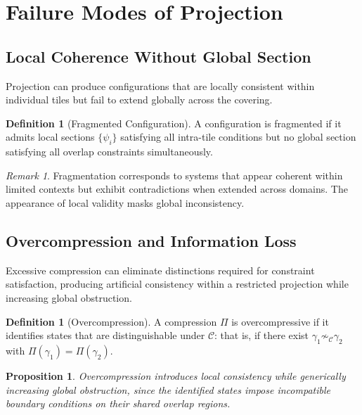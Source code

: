 \documentclass[11pt]{article}
\theoremstyle{plain}
\newtheorem{proposition}[theorem]{Proposition}
\theoremstyle{definition}
\newtheorem{definition}[theorem]{Definition}
\theoremstyle{remark}
\newtheorem{remark}[theorem]{Remark}
\begin{document}
\section{Failure Modes of Projection}

\subsection{Local Coherence Without Global Section}

Projection can produce configurations that are locally consistent within
individual tiles but fail to extend globally across the covering.

\begin{definition}[Fragmented Configuration]
A configuration is fragmented if it admits local sections $\{\psi_i\}$
satisfying all intra-tile conditions but no global section satisfying
all overlap constraints simultaneously.
\end{definition}

\begin{remark}
Fragmentation corresponds to systems that appear coherent within limited
contexts but exhibit contradictions when extended across domains. The
appearance of local validity masks global inconsistency.
\end{remark}

\subsection{Overcompression and Information Loss}

Excessive compression can eliminate distinctions required for constraint
satisfaction, producing artificial consistency within a restricted
projection while increasing global obstruction.

\begin{definition}[Overcompression]
A compression $\Pi$ is overcompressive if it identifies states that are
distinguishable under $\mathcal{C}$: that is, if there exist
$\gamma_1 \not\sim_{\mathcal{C}} \gamma_2$ with $\Pi(\gamma_1) = \Pi(\gamma_2)$.
\end{definition}

\begin{proposition}
Overcompression introduces local consistency while generically increasing
global obstruction, since the identified states impose incompatible
boundary conditions on their shared overlap regions.
\end{proposition}
\end{document}
